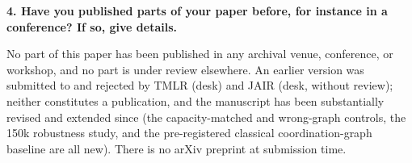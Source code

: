 \documentclass[10pt,a4paper]{article}
\newcommand{\Q}[1]{\vspace{4pt}\textbf{#1}\par\vspace{1pt}}
\begin{document}
\Q{4. Have you published parts of your paper before, for instance in a
conference? If so, give details.}

No part of this paper has been published in any archival venue, conference, or
workshop, and no part is under review elsewhere. An earlier version was submitted
to and rejected by TMLR (desk) and JAIR (desk, without review); neither
constitutes a publication, and the manuscript has been substantially revised and
extended since (the capacity-matched and wrong-graph controls, the 150k
robustness study, and the pre-registered classical coordination-graph baseline
are all new). There is no arXiv preprint at submission time.
\end{document}
